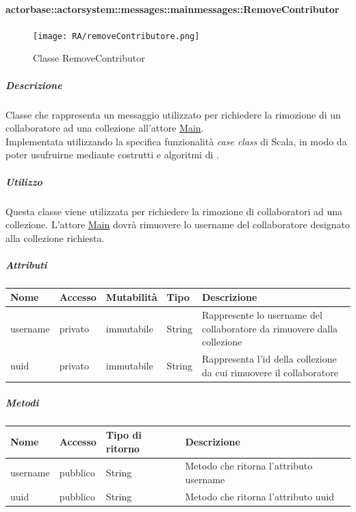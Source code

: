 \documentclass{scalatekids-article}
\begin{document}
\paragraph{actorbase::actorsystem::messages::mainmessages::RemoveContributor}
\label{sec:actorbase::actorsystem::messages::mainmessages::RemoveContributor}

\begin{figure}[H]
  \begin{center}
    \texttt{[image: RA/removeContributore.png]}
    \caption{Classe RemoveContributor}
  \end{center}
\end{figure}

\subparagraph{Descrizione}
Classe che rappresenta un messaggio utilizzato per richiedere la rimozione di un
collaboratore ad una collezione all'attore \hyperref[sec:actorbase::actorsystem::actors::main::Main]{Main}.\\Implementata
utilizzando la specifica funzionalità \textit{case class} di Scala, in modo da poter usufruirne mediante costrutti e algoritmi di
.

\subparagraph{Utilizzo}
Questa classe viene utilizzata per richiedere la rimozione di collaboratori ad
una collezione. L'attore
\hyperref[sec:actorbase::actorsystem::actors::main::Main]{Main} dovrà rimuovere
lo username del collaboratore designato alla collezione richiesta.

\subparagraph{Attributi}
\begin{tabular}{| p{2cm} | p{1.5cm} | p{2cm} | p{3cm} | p{8.5cm} |}
  \hline
  Nome & Accesso & Mutabilità & Tipo & Descrizione\\
  \hline
  username & privato & immutabile & String & Rappresente lo username del collaboratore da rimuovere dalla collezione\\
  \hline
  uuid & privato & immutabile & String & Rappresenta l'id della collezione da cui rimuovere il collaboratore\\
  \hline
\end{tabular}

\subparagraph{Metodi}
\begin{tabular}{| l | l | l | l |}
  \hline
  Nome & Accesso & Tipo di ritorno & Descrizione\\
  \hline
  username & pubblico & String & Metodo che ritorna l'attributo username\\
  \hline
  uuid & pubblico & String & Metodo che ritorna l'attributo uuid\\
  \hline
\end{tabular}
\end{document}
